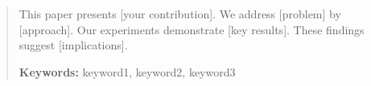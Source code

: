\begin{abstract}

This paper presents [your contribution]. We address [problem] by [approach].
Our experiments demonstrate [key results]. These findings suggest [implications].

\textbf{Keywords:} keyword1, keyword2, keyword3
\end{abstract}

